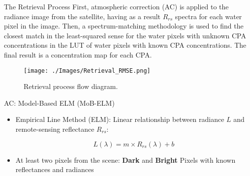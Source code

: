 \documentclass{beamer}
\begin{document}
\begin{frame}{}
\begin{columns}[t]
 \begin{column}{.32\linewidth}  %
\begin{block}{The Retrieval Process}
\justifying\small First, atmospheric correction (AC) is applied to the radiance image from the satellite, having as a result $R_{rs}$ spectra for each water pixel in the image. Then, a spectrum-matching methodology is used to find the closest match in the least-squared sense for the water pixels with unknown CPA concentrations in the LUT of water pixels with known CPA concentrations. The final result is a concentration map for each CPA.
\vspace{1cm}   
\begin{center}
\begin{figure}[htbp!]
  \centering
    \texttt{[image: ./Images/Retrieval\_RMSE.png]}
    \caption{Retrieval process flow diagram.   \label{fig:retrieval} }
\end{figure}
\end{center}
\end{block}




\begin{block}{AC: Model-Based ELM (MoB-ELM)}

\begin{itemize}
  \item \small Empirical Line Method (ELM): Linear relationship between radiance $L$ and remote-sensing reflectance $R_{rs}$:

\begin{equation*}
  L(\lambda)=m\times R_{rs}(\lambda)+b
\end{equation*}

\vspace{0.26cm}
\item \small At least two pixels from the scene: {\bf \small Dark} and {\bf \small Bright} Pixels with known reflectances and radiances

\end{itemize}

\begin{figure}[htb]
  \centering
{}
\end{figure}
\end{block}
\end{column}
\end{columns}
\end{frame}
\end{document}
